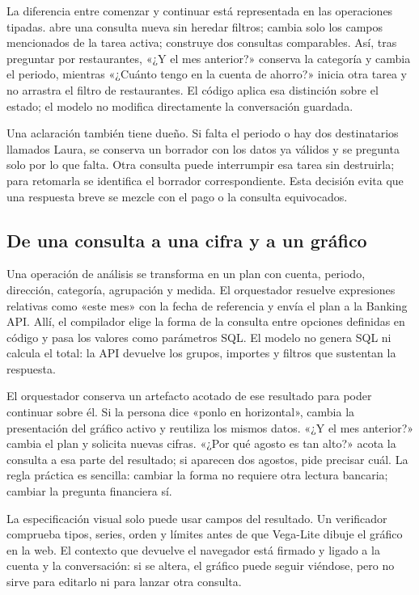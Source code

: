 \documentclass[12pt,a4paper]{article}
\begin{document}
La diferencia entre comenzar y continuar está representada en las operaciones tipadas.  abre una consulta nueva sin heredar filtros;  cambia solo los campos mencionados de la tarea activa;  construye dos consultas comparables. Así, tras preguntar por restaurantes, «¿Y el mes anterior?» conserva la categoría y cambia el periodo, mientras «¿Cuánto tengo en la cuenta de ahorro?» inicia otra tarea y no arrastra el filtro de restaurantes. El código aplica esa distinción sobre el estado; el modelo no modifica directamente la conversación guardada.

Una aclaración también tiene dueño. Si falta el periodo o hay dos destinatarios llamados Laura, se conserva un borrador con los datos ya válidos y se pregunta solo por lo que falta. Otra consulta puede interrumpir esa tarea sin destruirla; para retomarla se identifica el borrador correspondiente. Esta decisión evita que una respuesta breve se mezcle con el pago o la consulta equivocados.

\subsection{De una consulta a una cifra y a un gráfico}
Una operación de análisis se transforma en un plan con cuenta, periodo, dirección, categoría, agrupación y medida. El orquestador resuelve expresiones relativas como «este mes» con la fecha de referencia y envía el plan a la Banking API. Allí, el compilador elige la forma de la consulta entre opciones definidas en código y pasa los valores como parámetros SQL. El modelo no genera SQL ni calcula el total: la API devuelve los grupos, importes y filtros que sustentan la respuesta.

El orquestador conserva un artefacto acotado de ese resultado para poder continuar sobre él. Si la persona dice «ponlo en horizontal»,  cambia la presentación del gráfico activo y reutiliza los mismos datos. «¿Y el mes anterior?» cambia el plan y solicita nuevas cifras. «¿Por qué agosto es tan alto?» acota la consulta a esa parte del resultado; si aparecen dos agostos, pide precisar cuál. La regla práctica es sencilla: cambiar la forma no requiere otra lectura bancaria; cambiar la pregunta financiera sí.

La especificación visual solo puede usar campos del resultado. Un verificador comprueba tipos, series, orden y límites antes de que Vega-Lite dibuje el gráfico en la web. El contexto que devuelve el navegador está firmado y ligado a la cuenta y la conversación: si se altera, el gráfico puede seguir viéndose, pero no sirve para editarlo ni para lanzar otra consulta.
\end{document}
